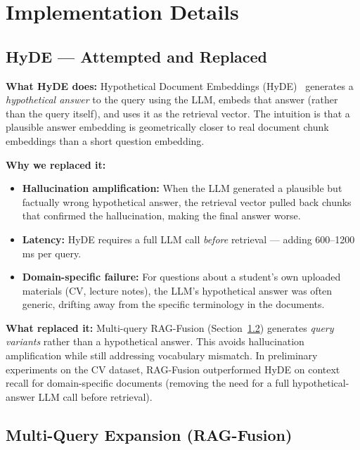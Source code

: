 \documentclass[12pt,a4paper]{article}
\begin{document}
\section{Implementation Details}

\subsection{HyDE — Attempted and Replaced}

\textbf{What HyDE does:}
Hypothetical Document Embeddings (HyDE)~\cite{gao2022hyde} generates a \emph{hypothetical answer} to the query using the LLM, embeds that answer (rather than the query itself), and uses it as the retrieval vector. The intuition is that a plausible answer embedding is geometrically closer to real document chunk embeddings than a short question embedding.

\textbf{Why we replaced it:}
\begin{itemize}
  \item \textbf{Hallucination amplification:} When the LLM generated a plausible but factually wrong hypothetical answer, the retrieval vector pulled back chunks that confirmed the hallucination, making the final answer worse.
  \item \textbf{Latency:} HyDE requires a full LLM call \emph{before} retrieval — adding 600--1200 ms per query.
  \item \textbf{Domain-specific failure:} For questions about a student's own uploaded materials (CV, lecture notes), the LLM's hypothetical answer was often generic, drifting away from the specific terminology in the documents.
\end{itemize}

\textbf{What replaced it:}
Multi-query RAG-Fusion (Section~\ref{sec:multiquery}) generates \emph{query variants} rather than a hypothetical answer. This avoids hallucination amplification while still addressing vocabulary mismatch. In preliminary experiments on the CV dataset, RAG-Fusion outperformed HyDE on context recall for domain-specific documents (removing the need for a full hypothetical-answer LLM call before retrieval).

\subsection{Multi-Query Expansion (RAG-Fusion)}
\label{sec:multiquery}
\end{document}
